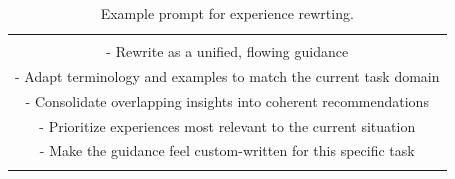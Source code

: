 \documentclass[11pt]{article}
\begin{document}
\begin{table}
\begin{tabular}{c}
\begin{tcolorbox}[title={Example Prompt for Experience Rewriting},breakable,]
  Guidelines:\\
  - Rewrite as a unified, flowing guidance\\
  - Adapt terminology and examples to match the current task domain\\
  - Consolidate overlapping insights into coherent recommendations\\
  - Prioritize experiences most relevant to the current situation\\
  - Make the guidance feel custom-written for this specific task\\
\end{tcolorbox}
\end{tabular}
\caption{Example prompt for experience rewrting.}
\label{tab:rewrite_prompt}
\end{table}
\end{document}
